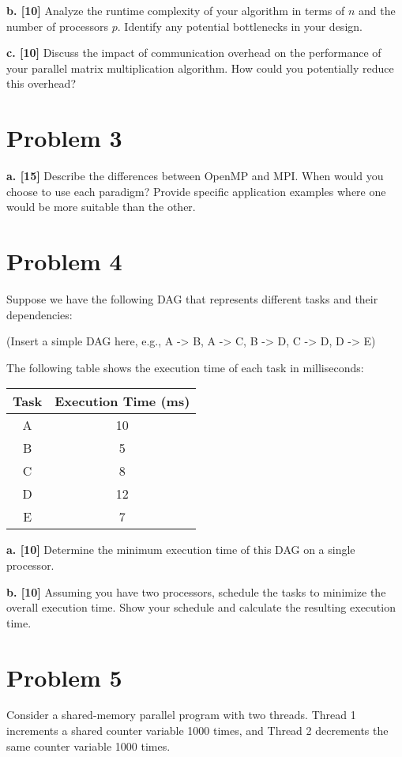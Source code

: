 \documentclass{article}
\begin{document}
\textbf{b. [10]}  Analyze the runtime complexity of your algorithm in terms of $n$ and the number of processors $p$.  Identify any potential bottlenecks in your design.

\textbf{c. [10]}  Discuss the impact of communication overhead on the performance of your parallel matrix multiplication algorithm.  How could you potentially reduce this overhead?


\section*{Problem 3}
\textbf{a. [15]} Describe the differences between OpenMP and MPI.  When would you choose to use each paradigm?  Provide specific application examples where one would be more suitable than the other.


\section*{Problem 4}
Suppose we have the following DAG that represents different tasks and their dependencies:

(Insert a simple DAG here, e.g., A -> B, A -> C, B -> D, C -> D, D -> E)

The following table shows the execution time of each task in milliseconds:

\begin{tabular}{|c|c|}
\hline
Task & Execution Time (ms) \\ \hline
A & 10 \\ \hline
B & 5 \\ \hline
C & 8 \\ \hline
D & 12 \\ \hline
E & 7 \\ \hline
\end{tabular}

\textbf{a. [10]}  Determine the minimum execution time of this DAG on a single processor.

\textbf{b. [10]}  Assuming you have two processors, schedule the tasks to minimize the overall execution time. Show your schedule and calculate the resulting execution time.


\section*{Problem 5}
Consider a shared-memory parallel program with two threads.  Thread 1 increments a shared counter variable 1000 times, and Thread 2 decrements the same counter variable 1000 times.
\end{document}
